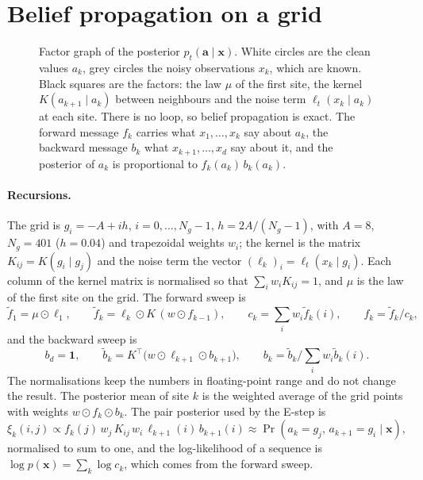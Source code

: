 \documentclass{article}
\begin{document}
\section{Belief propagation on a grid}
\label{app:bp}

\begin{figure}[!htbp]
  \centering
  
  \caption{Factor graph of the posterior $p_t(\mathbf a\mid\mathbf x)$. White circles are the clean values $a_k$, grey
  circles the noisy observations $x_k$, which are known. Black squares are the factors: the law $\mu$ of the first site,
  the kernel $K(a_{k+1}\mid a_k)$ between neighbours and the noise term $\ell_t(x_k\mid a_k)$ at each site. There is no
  loop, so belief propagation is exact. The forward message $f_k$ carries what $x_1,\ldots,x_k$ say about $a_k$, the
  backward message $b_k$ what $x_{k+1},\ldots,x_d$ say about it, and the posterior of $a_k$ is proportional to
  $f_k(a_k)\,b_k(a_k)$.}
  \label{fig:factor-graph}
\end{figure}

\paragraph{Recursions.} The grid is $g_i=-A+ih$, $i=0,\ldots,N_g-1$, $h=2A/(N_g-1)$, with $A=8$, $N_g=401$
($h=0.04$) and trapezoidal weights $w_i$; the kernel is the matrix $K_{ij}=K(g_i\mid g_j)$ and the noise term the vector
$(\ell_k)_i=\ell_t(x_k\mid g_i)$. Each column of the kernel matrix is normalised so that
$\sum_iw_iK_{ij}=1$, and $\mu$ is the law of the first site on the grid. The forward sweep is
\begin{equation}
  \tilde f_1=\mu\odot\ell_1,\qquad
  \tilde f_k=\ell_k\odot K\,(w\odot f_{k-1}),\qquad
  c_k=\sum_iw_i\tilde f_k(i),\qquad f_k=\tilde f_k/c_k ,
\end{equation}
and the backward sweep is
\begin{equation}
  b_d=\mathbf 1,\qquad
  \tilde b_k=K^{\top}\big(w\odot\ell_{k+1}\odot b_{k+1}\big),\qquad
  b_k=\tilde b_k\big/\textstyle\sum_iw_i\tilde b_k(i).
\end{equation}
The normalisations keep the numbers in floating-point range and do not change the result. The posterior mean of site
$k$ is the weighted average of the grid points with weights $w\odot f_k\odot b_k$. The pair posterior used by the E-step
is
\begin{equation}
  \xi_k(i,j)\propto f_k(j)\,w_j\,K_{ij}\,w_i\,\ell_{k+1}(i)\,b_{k+1}(i)
  \approx\Pr(a_k=g_j,\,a_{k+1}=g_i\mid\mathbf x),
\end{equation}
normalised to sum to one, and the log-likelihood of a sequence is $\log p(\mathbf x)=\sum_k\log c_k$, which comes from the forward sweep.
\end{document}
